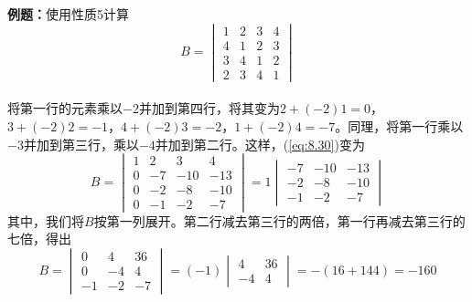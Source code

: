     \begin{examplebox}
        \textbf{例题：}使用性质5计算
        \begin{equation}
            B = \begin{vmatrix}
                1 & 2 & 3 & 4 \\
                4 & 1 & 2 & 3 \\
                3 & 4 & 1 & 2 \\
                2 & 3 & 4 & 1
            \end{vmatrix}
            \label{eq:8.30}
        \end{equation}
        \\

        将第一行的元素乘以$-2$并加到第四行，将其变为$2+\left(-2\right)1=0$，$3+\left(-2\right)2= -1$，$4+\left(-2\right)3 = -2$，$1+\left(-2\right)4 = -7$。同理，将第一行乘以$-3$并加到第三行，乘以$-4$并加到第二行。这样，(\ref{eq:8.30})变为
        \begin{equation}
            B = \begin{vmatrix}
                1 & 2 & 3 & 4 \\
                0 & -7 & -10 & -13 \\
                0 & -2 & -8 & -10 \\
                0 & -1 & -2 & -7
            \end{vmatrix} = 1\begin{vmatrix}
                -7 & -10 & -13 \\
                -2 & -8 & -10 \\
                -1 & -2 & -7
            \end{vmatrix}
            \label{eq:8.31}
        \end{equation}
        其中，我们将$B$按第一列展开。第二行减去第三行的两倍，第一行再减去第三行的七倍，得出
        \begin{equation}
            B = \begin{vmatrix}
                0 & 4 & 36 \\
                0 & -4 & 4 \\
                -1 & -2 & -7
            \end{vmatrix} = \left(-1\right)\begin{vmatrix}
                4 & 36 \\
                -4 & 4
            \end{vmatrix} = -\left(16 + 144\right) = -160
            \label{eq:8.32}
        \end{equation}
    \end{examplebox}

